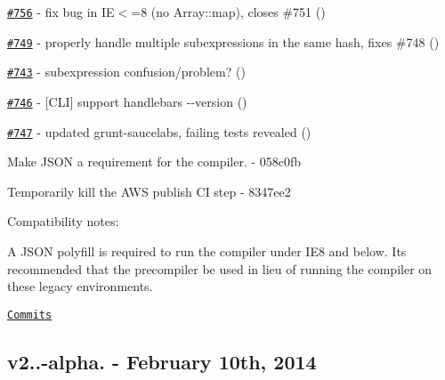 \begin{DoxyItemize}
\item \href{https://github.com/wycats/handlebars.js/pull/756}{\tt \#756} -\/ fix bug in I\+E$<$=8 (no Array\+::map), closes \#751 (\href{https://api.github.com/users/jenseng}{\tt })
\item \href{https://github.com/wycats/handlebars.js/pull/749}{\tt \#749} -\/ properly handle multiple subexpressions in the same hash, fixes \#748 (\href{https://api.github.com/users/jenseng}{\tt })
\item \href{https://github.com/wycats/handlebars.js/issues/743}{\tt \#743} -\/ subexpression confusion/problem? (\href{https://api.github.com/users/waynedpj}{\tt })
\item \href{https://github.com/wycats/handlebars.js/issues/746}{\tt \#746} -\/ \mbox{[}C\+L\+I\mbox{]} support {\ttfamily handlebars -\/-\/version} (\href{https://api.github.com/users/apfelbox}{\tt })
\item \href{https://github.com/wycats/handlebars.js/pull/747}{\tt \#747} -\/ updated grunt-\/saucelabs, failing tests revealed (\href{https://api.github.com/users/Jonahss}{\tt })
\item Make J\+S\+O\+N a requirement for the compiler. -\/ 058c0fb
\item Temporarily kill the A\+W\+S publish C\+I step -\/ 8347ee2
\end{DoxyItemize}

Compatibility notes\+:
\begin{DoxyItemize}
\item A J\+S\+O\+N polyfill is required to run the compiler under I\+E8 and below. It\textquotesingle{}s recommended that the precompiler be used in lieu of running the compiler on these legacy environments.
\end{DoxyItemize}

\href{https://github.com/wycats/handlebars.js/compare/v2.0.0-alpha.1...v2.0.0-alpha.2}{\tt Commits}

\subsection*{v2..-\/alpha. -\/ February 10th, 2014}


